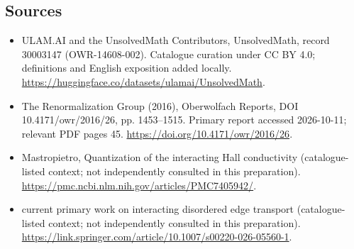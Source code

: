 \documentclass[11pt]{article}
\begin{document}
\subsection{Sources}
\begin{itemize}
\item[\hypertarget{source:30003147:1}{S1}] ULAM.AI and the UnsolvedMath Contributors, UnsolvedMath, record 30003147 (OWR-14608-002). Catalogue curation under CC BY 4.0; definitions and English exposition added locally.
\url{https://huggingface.co/datasets/ulamai/UnsolvedMath}.
\item[\hypertarget{source:30003147:2}{S2}] The Renormalization Group (2016), Oberwolfach Reports, DOI 10.4171/owr/2016/26, pp. 1453--1515. Primary report accessed 2026-10-11; relevant PDF pages 45.
\url{https://doi.org/10.4171/owr/2016/26}.
\item[\hypertarget{source:30003147:3}{S3}] Mastropietro, Quantization of the interacting Hall conductivity (catalogue-listed context; not independently consulted in this preparation).
\url{https://pmc.ncbi.nlm.nih.gov/articles/PMC7405942/}.
\item[\hypertarget{source:30003147:4}{S4}] current primary work on interacting disordered edge transport (catalogue-listed context; not independently consulted in this preparation).
\url{https://link.springer.com/article/10.1007/s00220-026-05560-1}.
\end{itemize}
\label{end:30003147}
\end{document}
